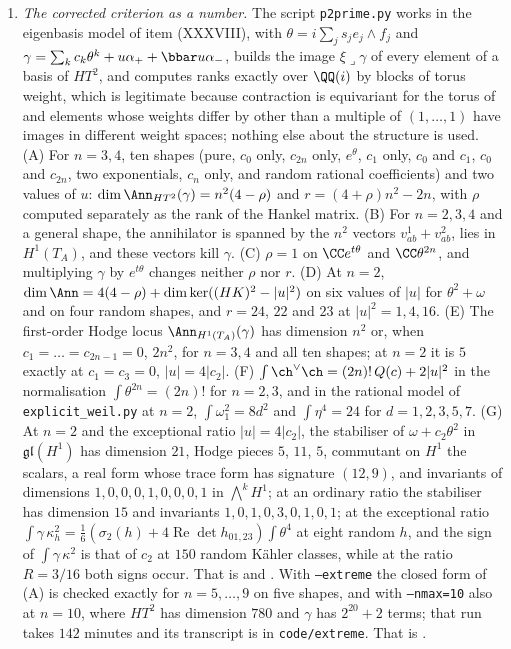 \begin{enumerate}[label=\textup{(\Roman*)},leftmargin=*]
\item \emph{The corrected criterion as a number.} The script
  \texttt{p2prime.py} works in the eigenbasis model of item (XXXVIII), with
  $\theta=i\sum_{j}s_{j}e_{j}\wedge f_{j}$ and
  $\gamma=\sum_{k}c_{k}\theta^{k}+u\alpha_{+}+\bbar u\alpha_{-}$, builds the
  image $\xi\lrcorner\gamma$ of every element of a basis of $HT^{2}$, and
  computes ranks exactly over $\QQ(i)$ by blocks of torus weight, which is
  legitimate because contraction is equivariant for the torus of
   and elements whose weights differ by other than a
  multiple of $(1,\dots,1)$ have images in different weight spaces; nothing
  else about the structure is used. (A) For $n=3,4$, ten shapes (pure, $c_{0}$
  only, $c_{2n}$ only, $e^{\theta}$, $c_{1}$ only, $c_{0}$ and $c_{1}$, $c_{0}$
  and $c_{2n}$, two exponentials, $c_{n}$ only, and random rational
  coefficients) and two values of $u$: $\dim\Ann_{HT^{2}}(\gamma)=n^{2}(4-\rho)$
  and $r=(4+\rho)n^{2}-2n$, with $\rho$ computed separately as the rank of the
  Hankel matrix. (B) For $n=2,3,4$ and a general shape, the annihilator is
  spanned by the $n^{2}$ vectors $v^{1}_{ab}+v^{2}_{ab}$, lies in $H^{1}(T_{A})$,
  and these vectors kill $\gamma$. (C) $\rho=1$ on $\CC e^{t\theta}$ and
  $\CC\theta^{2n}$, and multiplying $\gamma$ by $e^{t\theta}$ changes neither
  $\rho$ nor $r$. (D) At $n=2$, $\dim\Ann=4(4-\rho)+\dim\ker((HK)^{2}-|u|^{2})$
  on six values of $|u|$ for $\theta^{2}+\omega$ and on four random shapes, and
  $r=24$, $22$ and $23$ at $|u|^{2}=1,4,16$. (E) The first-order Hodge locus
  $\Ann_{H^{1}(T_{A})}(\gamma)$ has dimension $n^{2}$ or, when
  $c_{1}=\dots=c_{2n-1}=0$, $2n^{2}$, for $n=3,4$ and all ten shapes; at $n=2$
  it is $5$ exactly at $c_{1}=c_{3}=0$, $|u|=4|c_{2}|$. (F)
  $\int\ch^{\vee}\ch=(2n)!\,Q(c)+2|u|^{2}$ in the normalisation
  $\int\theta^{2n}=(2n)!$ for $n=2,3$, and in the rational model of
  \texttt{explicit\_weil.py} at $n=2$, $\int\omega_{1}^{2}=8d^{2}$ and
  $\int\eta^{4}=24$ for $d=1,2,3,5,7$. (G) At $n=2$ and the exceptional
  ratio $|u|=4|c_{2}|$, the stabiliser of $\omega+c_{2}\theta^{2}$ in
  $\mathfrak{gl}(H^{1})$ has dimension $21$, Hodge pieces $5$, $11$, $5$,
  commutant on $H^{1}$ the scalars, a real form whose trace form has
  signature $(12,9)$, and invariants of dimensions $1,0,0,0,1,0,0,0,1$ in
  $\bigwedge^{k}H^{1}$; at an ordinary ratio the stabiliser has dimension $15$
  and invariants $1,0,1,0,3,0,1,0,1$; at the exceptional ratio
  $\int\gamma\,\kappa_{h}^{2}=\frac16(\sigma_{2}(h)+4\operatorname{Re}\det
  h_{01,23})\int\theta^{4}$ at eight random $h$, and the sign of
  $\int\gamma\,\kappa^{2}$ is that of $c_{2}$ at $150$ random K\"ahler
  classes, while at the ratio $R=3/16$ both signs occur. That is
   and . With
  \texttt{--extreme} the closed form
  of (A) is checked exactly for $n=5,\dots,9$ on five shapes, and with
  \texttt{--nmax=10} also at $n=10$, where $HT^{2}$ has dimension $780$ and
  $\gamma$ has $2^{20}+2$ terms; that run takes $142$ minutes and its
  transcript is in \texttt{code/extreme}. That is .


\end{enumerate}
